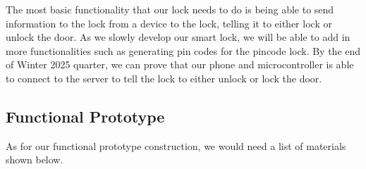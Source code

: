 The most basic functionality that our lock needs to do is being able to send information to the lock from a device to the lock, telling it to either lock or unlock the door. As we slowly develop our smart lock, we will be able to add in more functionalities such as generating pin codes for the pincode lock. By the end of Winter 2025 quarter, we can prove that our phone and microcontroller is able to connect to the server to tell the lock to either unlock or lock the door.

\subsection{Functional Prototype}

As for our functional prototype construction, we would need a list of materials shown below.

